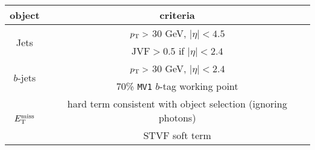 \begin{tabular}{c|c}
  object   & criteria \\
  \hline\hline
  \multirow{2}{*}{Jets}     & $p_{\mathrm{T}} >$ 30 GeV, $|\eta| < 4.5$ \\
                            & $\text{JVF} > 0.5$ if $|\eta| < 2.4$ \\
  \hline
  \multirow{2}{*}{$b$-jets} & $p_{\mathrm{T}} >$ 30 GeV, $|\eta| < 2.4$ \\
                            & 70\% \texttt{MV1} $b$-tag working point\\
  \hline
  \multirow{2}{*}{$E_{\mathrm{T}}^{\mathrm{miss}}$}   & hard term consistent with object selection (ignoring photons) \\
                            & STVF soft term \\
\end{tabular}
